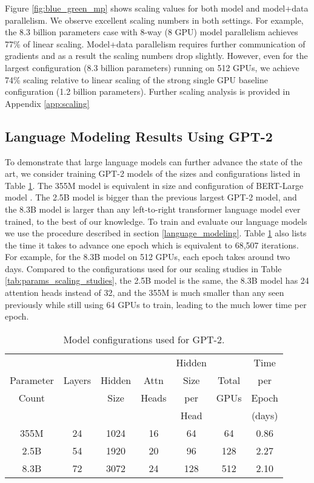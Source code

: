\documentclass{article}
\begin{document}
Figure \ref{fig:blue_green_mp} shows scaling values for both model and model+data parallelism. We observe excellent scaling numbers in both settings. For example, the 8.3 billion parameters case with 8-way (8 GPU) model parallelism achieves 77\% of linear scaling. Model+data parallelism requires further communication of gradients and as a result the scaling numbers drop slightly. However, even for the largest configuration (8.3 billion parameters) running on 512 GPUs, we achieve 74\% scaling relative to linear scaling of the strong single GPU baseline configuration (1.2 billion parameters). Further scaling analysis is provided in Appendix \ref{app:scaling}



\subsection{Language Modeling Results Using GPT-2}
To demonstrate that large language models can further advance the state of the art, we consider training GPT-2 models of the sizes and configurations listed in Table \ref{tab:model_size}. The 355M model is equivalent in size and configuration of BERT-Large model \cite{devlin2018bert}. The 2.5B model is bigger than the previous largest GPT-2 model, and the 8.3B model is larger than any left-to-right transformer language model ever trained, to the best of our knowledge. To train and evaluate our language models we use the procedure described in section \ref{language_modeling}. Table \ref{tab:model_size} also lists the time it takes to advance one epoch which is equivalent to 68,507 iterations. For example, for the 8.3B model on 512 GPUs, each epoch takes around two days. Compared to the configurations used for our scaling studies in Table \ref{tab:params_scaling_studies}, the 2.5B model is the same, the 8.3B model has 24 attention heads instead of 32, and the 355M is much smaller than any seen previously while still using 64 GPUs to train, leading to the much lower time per epoch.

\begin{table}
\footnotesize
\begin{center}
\caption{Model configurations used for GPT-2.}
\label{tab:model_size}
\begin{tabular}{c@{\hskip3pt}|@{\hskip3pt}c@{\hskip3pt}|@{\hskip3pt}c@{\hskip3pt}|@{\hskip3pt}c@{\hskip3pt}|@{\hskip3pt}c@{\hskip3pt}|@{\hskip3pt}c@{\hskip3pt}|@{\hskip3pt}c} \hline \hline
 &  &  &  & Hidden &  & Time \\
Parameter & Layers & Hidden & Attn & Size & Total & per \\
Count &  & Size & Heads & per & GPUs & Epoch \\
 &  &  &  & Head &  & (days) \\ \hline
355M & 24 &  1024 &	16 & 64  &  64  & 0.86  \\ 
2.5B &  54 & 1920 & 20 & 96  &  128 & 2.27  \\ 
8.3B & 72 & 3072 &  24 &  128 & 512 & 2.10   \\ \hline 
\end{tabular}
\end{center}
\end{table}
\end{document}
